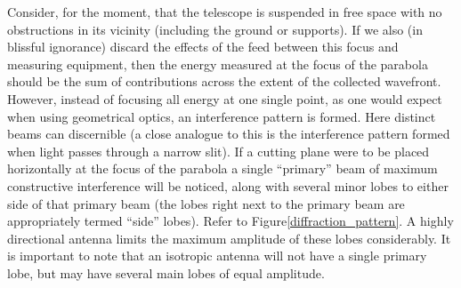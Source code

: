 \documentclass[a4paper,10pt]{report}
\begin{document}
Consider, for the moment, that the telescope is suspended in free space with no obstructions in its vicinity (including the ground or supports). If
we also (in blissful ignorance) discard the effects of the feed between this focus and measuring equipment, then the energy measured at the focus 
of the parabola should be the sum of contributions across the extent of the collected wavefront. However, instead of focusing all 
energy at one single point, as one would expect when using geometrical optics, an interference pattern is formed. Here
distinct beams can discernible (a close analogue to this is the interference pattern formed when light passes through a narrow slit).
If a cutting plane were to be placed horizontally at the focus of the parabola a single ``primary'' beam of maximum 
constructive interference will be noticed, along with several minor lobes to either side of that primary beam (the lobes right 
next to the primary beam are appropriately termed ``side'' lobes). Refer to Figure\ref{diffraction_pattern}. A highly directional antenna 
limits the maximum amplitude of these lobes considerably. It is important to note that an isotropic antenna will not have a single primary 
lobe, but may have several main lobes of equal amplitude. 
\end{document}
